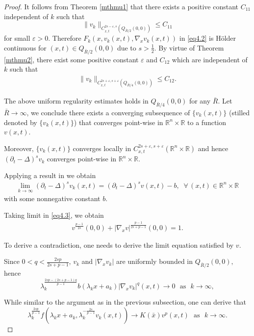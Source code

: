 \documentclass[12pt]{article}
\theoremstyle{remark}
\numberwithin{equation}{section}
\newcommand{\R}{\mathbb{R}}
\begin{document}
\begin{proof}
 It follows
from Theorem \ref{mthmu1} that there exists a positive constant $C_{11}$ independent of $k$ such that
$$
\|v_k\|_{C_{x,t}^{2s-\varepsilon, s}(Q_{\bar{R}/2}(0,0))} \leq C_{11}
$$
for small $\varepsilon>0.$
Therefore  $F_k(x, v_k(x,t), \nabla_x v_k(x,t))$ in \eqref{eq4.2} is H\"{o}lder continuous for $(x,t) \in Q_{\bar{R}/2}(0,0)$  due to $s>\frac{1}{2}.$  By virtue of Theorem \ref{mthmu2}, there exist some  positive constant $\varepsilon$ and $C_{12}$ which are independent of $k$ such that
\begin{eqnarray}\label{eq4.5}
\|v_k\|_{C_{x,t}^{2s+ \varepsilon, s+\varepsilon}(Q_{\bar{R}/4}(0,0))}\leq C_{12}.
\end{eqnarray}

The above uniform regularity estimates holds in $Q_{\bar{R}/4}(0,0)$ for any $\bar{R}$. Let $\bar{R} \to \infty$, we conclude there exists
 a converging subsequence of $\{v_k(x,t)\}$ (stilled denoted by $\{v_k(x,t)\}$) that converges point-wise in
 $\mathbb{R}^n \times \R$ to a function $v(x,t).$


Moreover, $\{v_k(x,t)\}$ converges locally in $C_{x,t}^{2s+\varepsilon, s + \varepsilon}(\R^n \times \R)$ and hence  $(\partial_t -\Delta)^s v_k$ converges point-wise in $\mathbb{R}^n \times \R$.

Applying a result in \cite{CGL} we obtain
\begin{eqnarray}\label{eq4-13a}
\lim_{k \to \infty} (\partial_t -\Delta)^s v_k(x,t)= (\partial_t-\Delta)^s v(x,t)-b, \;\; \forall \, (x,t) \in \mathbb{R}^n \times \R
\end{eqnarray}
with some nonnegative constant $b$.


Taking limit in \eqref{eq4.3}, we obtain
\begin{eqnarray}\label{eq4.6}
v^{\frac{p-1}{2s}}(0,0)+|\nabla_x v|^{\frac{p-1}{2s+p-1}}(0,0)= 1.
\end{eqnarray}

To derive a contradiction, one needs to derive the limit equation satisfied by $v$.

Since $0<q<\frac{2sp}{2s+p-1}$, $v_k$ and $|\nabla_x v_k|$ are uniformly bounded in $Q_{\bar{R}/2} (0,0),$ hence
$$
\lambda_k^{\frac{2sp-(2s+p-1)q}{p-1}} b(\lambda_k x+a_k)|\nabla_x v_k|^q(x,t)
\to 0\,\, \mbox{ as }\,\, k\to \infty,
$$

While similar to the argument as in the previous subsection, one can derive that
\begin{equation}\label{eq4.8}
\lambda_k^{\frac{2sp}{p-1}} f(\lambda_k x+a_k, \lambda_k^{-\frac{2s}{p-1}} v_k(x,t))
\to K(\bar x) v^p(x,t)\,\, \mbox{ as }\,\, k\to \infty.
\end{equation}



\end{proof}
\end{document}
